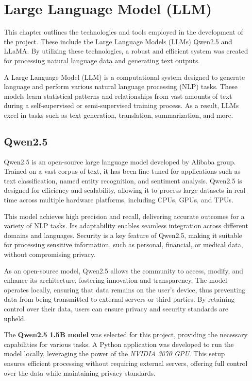 \chapter{Large Language Model (LLM)}

This chapter outlines the technologies and tools employed in the development of the project. These include the Large Language Models (LLMs) Qwen2.5 and LLaMA. By utilizing these technologies, a robust and efficient system was created for processing natural language data and generating text outputs.

A Large Language Model (LLM) is a computational system designed to generate language and perform various natural language processing (NLP) tasks. These models learn statistical patterns and relationships from vast amounts of text during a self-supervised or semi-supervised training process. As a result, LLMs excel in tasks such as text generation, translation, summarization, and more.

\section{Qwen2.5}

Qwen2.5 is an open-source large language model developed by Alibaba group. Trained on a vast corpus of text, it has been fine-tuned for applications such as text classification, named entity recognition, and sentiment analysis. Qwen2.5 is designed for efficiency and scalability, allowing it to process large datasets in real-time across multiple hardware platforms, including CPUs, GPUs, and TPUs.

This model achieves high precision and recall, delivering accurate outcomes for a variety of NLP tasks. Its adaptability enables seamless integration across different domains and languages. Security is a key feature of Qwen2.5, making it suitable for processing sensitive information, such as personal, financial, or medical data, without compromising privacy.

As an open-source model, Qwen2.5 allows the community to access, modify, and enhance its architecture, fostering innovation and transparency. The model operates locally, ensuring that data remains on the user's device, thus preventing data from being transmitted to external servers or third parties. By retaining control over their data, users can ensure privacy and security standards are upheld.

The \textbf{Qwen2.5 1.5B model} was selected for this project, providing the necessary capabilities for various tasks. A Python application was developed to run the model locally, leveraging the power of the \textit{NVIDIA 3070 GPU}. This setup ensures efficient processing without requiring external servers, offering full control over the data while maintaining privacy standards.

